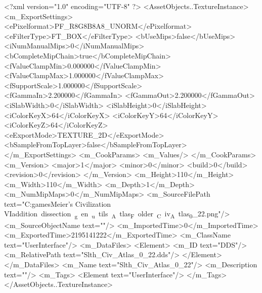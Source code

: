 <?xml version="1.0" encoding="UTF-8" ?>
<AssetObjects..TextureInstance>
	<m_ExportSettings>
		<ePixelformat>PF_R8G8B8A8_UNORM</ePixelformat>
		<eFilterType>FT_BOX</eFilterType>
		<bUseMips>false</bUseMips>
		<iNumManualMips>0</iNumManualMips>
		<bCompleteMipChain>true</bCompleteMipChain>
		<fValueClampMin>0.000000</fValueClampMin>
		<fValueClampMax>1.000000</fValueClampMax>
		<fSupportScale>1.000000</fSupportScale>
		<fGammaIn>2.200000</fGammaIn>
		<fGammaOut>2.200000</fGammaOut>
		<iSlabWidth>0</iSlabWidth>
		<iSlabHeight>0</iSlabHeight>
		<iColorKeyX>64</iColorKeyX>
		<iColorKeyY>64</iColorKeyY>
		<iColorKeyZ>64</iColorKeyZ>
		<eExportMode>TEXTURE_2D</eExportMode>
		<bSampleFromTopLayer>false</bSampleFromTopLayer>
	</m_ExportSettings>
	<m_CookParams>
		<m_Values/>
	</m_CookParams>
	<m_Version>
		<major>1</major>
		<minor>0</minor>
		<build>0</build>
		<revision>0</revision>
	</m_Version>
	<m_Height>110</m_Height>
	<m_Width>110</m_Width>
	<m_Depth>1</m_Depth>
	<m_NumMipMaps>0</m_NumMipMaps>
	<m_SourceFilePath text="C:\Users\Sam\Documents\my games\Sid Meier's Civilization VI\Mods\unit addition dissection\python_gen\build_utils\CIV_Atlas_Folder\Slth_Civ_Atlas_0_22.png"/>
	<m_SourceObjectName text=""/>
	<m_ImportedTime>0</m_ImportedTime>
	<m_ExportedTime>2195141222</m_ExportedTime>
	<m_ClassName text="UserInterface"/>
	<m_DataFiles>
		<Element>
			<m_ID text="DDS"/>
			<m_RelativePath text="Slth_Civ_Atlas_0_22.dds"/>
		</Element>
	</m_DataFiles>
	<m_Name text="Slth_Civ_Atlas_0_22"/>
	<m_Description text=""/>
	<m_Tags>
		<Element text="UserInterface"/>
	</m_Tags>
</AssetObjects..TextureInstance>

